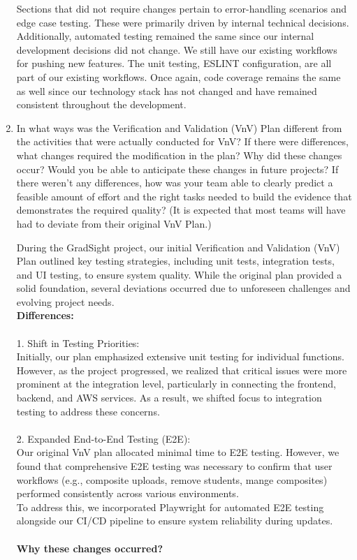 \documentclass[12pt, titlepage]{article}
\begin{document}
\begin{enumerate}
Sections that did not require changes pertain to error-handling scenarios and edge case testing. These were primarily driven by internal technical decisions.
Additionally, automated testing remained the same since our internal development decisions did not change. We still have our existing workflows for pushing new features. The unit testing, ESLINT configuration, are all part of our existing workflows.
Once again, code coverage remains the same as well since our technology stack has not changed and have remained consistent throughout the development.

  \item In what ways was the Verification and Validation (VnV) Plan different
  from the activities that were actually conducted for VnV?  If there were
  differences, what changes required the modification in the plan?  Why did
  these changes occur?  Would you be able to anticipate these changes in future
  projects?  If there weren't any differences, how was your team able to clearly
  predict a feasible amount of effort and the right tasks needed to build the
  evidence that demonstrates the required quality?  (It is expected that most
  teams will have had to deviate from their original VnV Plan.)

  During the GradSight project, our initial Verification and Validation (VnV) Plan outlined key testing strategies, including unit tests, integration tests, and UI testing, to ensure system quality. While the original plan provided a solid foundation, several deviations occurred due to unforeseen challenges and evolving project needs. \\

 \textbf{Differences:} \\
\\1. Shift in Testing Priorities: \\
Initially, our plan emphasized extensive unit testing for individual functions. However, as the project progressed, we realized that critical issues were more prominent at the integration level, particularly in connecting the frontend, backend, and AWS services. As a result, we shifted focus to integration testing to address these concerns. \\
\\2. Expanded End-to-End Testing (E2E):  \\
Our original VnV plan allocated minimal time to E2E testing. However, we found that comprehensive E2E testing was necessary to confirm that user workflows (e.g., composite uploads, remove students, mange composites) performed consistently across various environments.\\
To address this, we incorporated Playwright for automated E2E testing alongside our CI/CD pipeline to ensure system reliability during updates.\\
\\ \textbf{Why these changes occurred?}\\


\end{enumerate}
\end{document}
